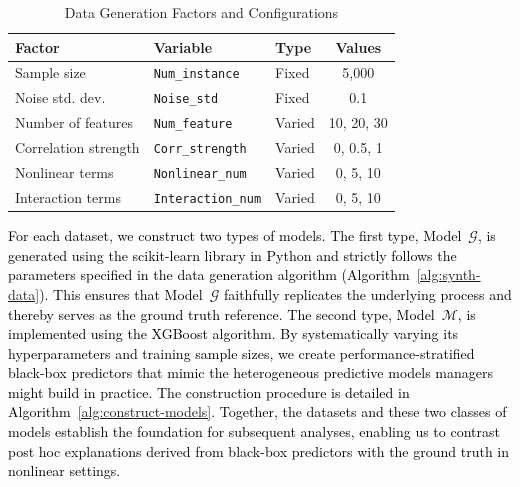 \documentclass[mnsc,blindrev]{informs3}
\begin{document}
\begin{table}[htbp]
\centering
\caption{Data Generation Factors and Configurations}
\label{tab:data_factors}
\begin{tabular}{lllc}
\toprule
\textbf{Factor} & \textbf{Variable} & \textbf{Type} & \textbf{Values} \\
\midrule
Sample size & \texttt{Num\_instance} & Fixed & 5{,}000 \\
Noise std. dev. & \texttt{Noise\_std} & Fixed & 0.1 \\
Number of features & \texttt{Num\_feature} & Varied & 10, 20, 30 \\
Correlation strength & \texttt{Corr\_strength} & Varied & 0, 0.5, 1 \\
Nonlinear terms & \texttt{Nonlinear\_num} & Varied & 0, 5, 10 \\
Interaction terms & \texttt{Interaction\_num} & Varied & 0, 5, 10 \\
\bottomrule
\end{tabular}
\end{table}

\textcolor{black}{For each dataset, we construct two types of models. The first type, Model~$\mathcal{G}$, is generated using the scikit-learn library in Python and strictly follows the parameters specified in the data generation algorithm (Algorithm~\ref{alg:synth-data}). This ensures that Model~$\mathcal{G}$ faithfully replicates the underlying process and thereby serves as the ground truth reference. The second type, Model~$\mathcal{M}$, is implemented using the XGBoost algorithm. By systematically varying its hyperparameters and training sample sizes, we create performance-stratified black-box predictors that mimic the heterogeneous predictive models managers might build in practice. The construction procedure is detailed in Algorithm~\ref{alg:construct-models}. Together, the datasets and these two classes of models establish the foundation for subsequent analyses, enabling us to contrast post hoc explanations derived from black-box predictors with the ground truth in nonlinear settings.}

\end{document}
